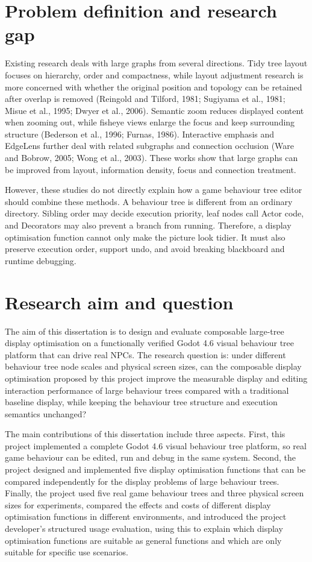 \documentclass[11pt,a4paper,oneside,extrafontsizes]{memoir}
\begin{document}
\section{Problem definition and research gap}

Existing research deals with large graphs from several directions. Tidy tree layout focuses on hierarchy, order and compactness, while layout adjustment research is more concerned with whether the original position and topology can be retained after overlap is removed (Reingold and Tilford, 1981; Sugiyama et al., 1981; Misue et al., 1995; Dwyer et al., 2006). Semantic zoom reduces displayed content when zooming out, while fisheye views enlarge the focus and keep surrounding structure (Bederson et al., 1996; Furnas, 1986). Interactive emphasis and EdgeLens further deal with related subgraphs and connection occlusion (Ware and Bobrow, 2005; Wong et al., 2003). These works show that large graphs can be improved from layout, information density, focus and connection treatment.

However, these studies do not directly explain how a game behaviour tree editor should combine these methods. A behaviour tree is different from an ordinary directory. Sibling order may decide execution priority, leaf nodes call Actor code, and Decorators may also prevent a branch from running. Therefore, a display optimisation function cannot only make the picture look tidier. It must also preserve execution order, support undo, and avoid breaking blackboard and runtime debugging.

\section{Research aim and question}

The aim of this dissertation is to design and evaluate composable large-tree display optimisation on a functionally verified Godot 4.6 visual behaviour tree platform that can drive real NPCs. The research question is: under different behaviour tree node scales and physical screen sizes, can the composable display optimisation proposed by this project improve the measurable display and editing interaction performance of large behaviour trees compared with a traditional baseline display, while keeping the behaviour tree structure and execution semantics unchanged?

The main contributions of this dissertation include three aspects. First, this project implemented a complete Godot 4.6 visual behaviour tree platform, so real game behaviour can be edited, run and debug in the same system. Second, the project designed and implemented five display optimisation functions that can be compared independently for the display problems of large behaviour trees. Finally, the project used five real game behaviour trees and three physical screen sizes for experiments, compared the effects and costs of different display optimisation functions in different environments, and introduced the project developer's structured usage evaluation, using this to explain which display optimisation functions are suitable as general functions and which are only suitable for specific use scenarios.
\end{document}
